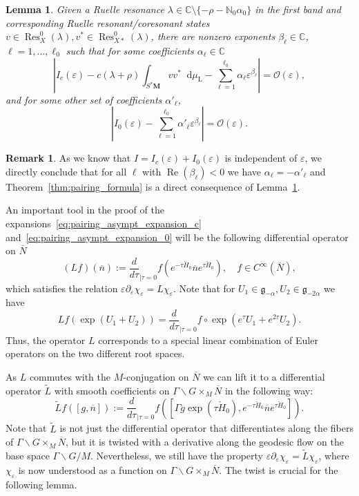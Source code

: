 \documentclass[10pt]{amsart}
\newtheorem{lemm}[cdrthm]{Lemma}
\theoremstyle{definition}
\newtheorem{rema}[cdrthm]{Remark}
\DeclareMathOperator{\Res}{Res}
\DeclareMathOperator{\Real}{Re}
\newcommand{\rml}{\mathrm{L}}
\newcommand{\mc}{\mathcal}
\newcommand{\cc}{\mathbb{C}}
\newcommand{\til}{\widetilde}
\newcommand{\N}{\mathbb{N}}
\newcommand{\intd}{\mathop{}\!\mathrm{d}}
\newcommand{\g}{\mathfrak g}
\newcommand{\bn}{{\overline{n}}}
\newcommand{\bN}{{\overline{N}}}
\newcommand{\cH}{{\check{H}_0}}
\begin{document}
\begin{lemm}\label{lem:pairing_asympt_expansion}
Given a Ruelle resonance $\lambda\in\cc\setminus\{-\rho - \N_0\alpha_0\}$ in the first band and corresponding Ruelle resonant/coresonant states $v\in\Res_X^0(\lambda), v^*\in\Res_{X*}^0(\lambda)$, there are nonzero exponents $\beta_\ell\in\cc$, $\ell=1,\ldots, \ell_0$ such that for some coefficients $\alpha_\ell \in\cc$
\begin{equation}\label{eq:pairing_asympt_expansion_c}
\left|I_c(\varepsilon) - c(\lambda + \rho) \int_{S^*\mathbf M} vv^*\intd \mu_{\rml} - \sum_{\ell=1}^{\ell_0} \alpha_\ell \varepsilon^{\beta_\ell}\right| = \mc{O}(\varepsilon),
\end{equation}
and for some other set of coefficients $\alpha'_\ell$,
\begin{equation}\label{eq:pairing_asympt_expansion_0}
\left|I_0(\varepsilon) - \sum_{\ell=1}^{\ell_0} \alpha'_\ell \varepsilon^{\beta_\ell}\right| = \mc{O}(\varepsilon).
\end{equation}
\end{lemm}

\begin{rema}
As we know that $I=I_c(\varepsilon)+I_0(\varepsilon)$ is independent of $\varepsilon$, we directly conclude that for all $\ell$ with $\Real(\beta_\ell)< 0$ we have $\alpha_\ell=-\alpha'_\ell$ and Theorem~\ref{thm:pairing_formula} is a direct consequence of Lemma~\ref{lem:pairing_asympt_expansion}.
\end{rema}


An important tool in the proof of the expansions~\eqref{eq:pairing_asympt_expansion_c} and~\eqref{eq:pairing_asympt_expansion_0} will be the following differential operator on $\bN$
\[
(L f)(\bn) := \frac{d}{d\tau}_{|\tau=0} f\left(e^{-\tau \cH}\bn e^{\tau \cH}\right),\quad f\in C^\infty(\bN),
\]
which satisfies the relation $\varepsilon\partial_{\varepsilon}\chi_\varepsilon = L\chi_\varepsilon$. Note that for $U_1\in \g_{-\alpha}, U_2\in\g_{-2\alpha}$ we have
\begin{equation}\label{eq:L_Euler}
Lf(\exp (U_1+U_2)) = \frac{d}{d\tau}_{|\tau=0} f\circ\exp\left(e^\tau U_1 + e^{2\tau} U_2\right).
\end{equation}
Thus, the operator $L$ corresponds to a special linear combination of Euler operators on the two different root spaces.



As $L$ commutes with the $M$-conjugation on $\bN$ we can lift it to a differential operator $\til L$ with smooth coefficients on $\Gamma\backslash G\times_M\bN$ in the following way:
\[
\til L f([g,\bn]) := \frac{d}{d\tau}_{|\tau=0} f\left(\left[\Gamma g\exp\left(\tau \check H_0\right), e^{-\tau\cH}\bn e^{\tau\cH}\right]\right).
\]
Note that $\til L$ is not just the differential operator that differentiates along the fibers of $\Gamma\backslash G\times_M\bN$, but it is twisted with a derivative along the geodesic flow on the base space $ \Gamma \backslash G/M$. Nevertheless, we still have the property $\varepsilon\partial_\varepsilon \chi_\varepsilon = \til L\chi_\varepsilon$, where $\chi_\varepsilon$ is now understood as a function on $\Gamma\backslash G\times_M\bN$. The twist is crucial for the following lemma.
\end{document}
